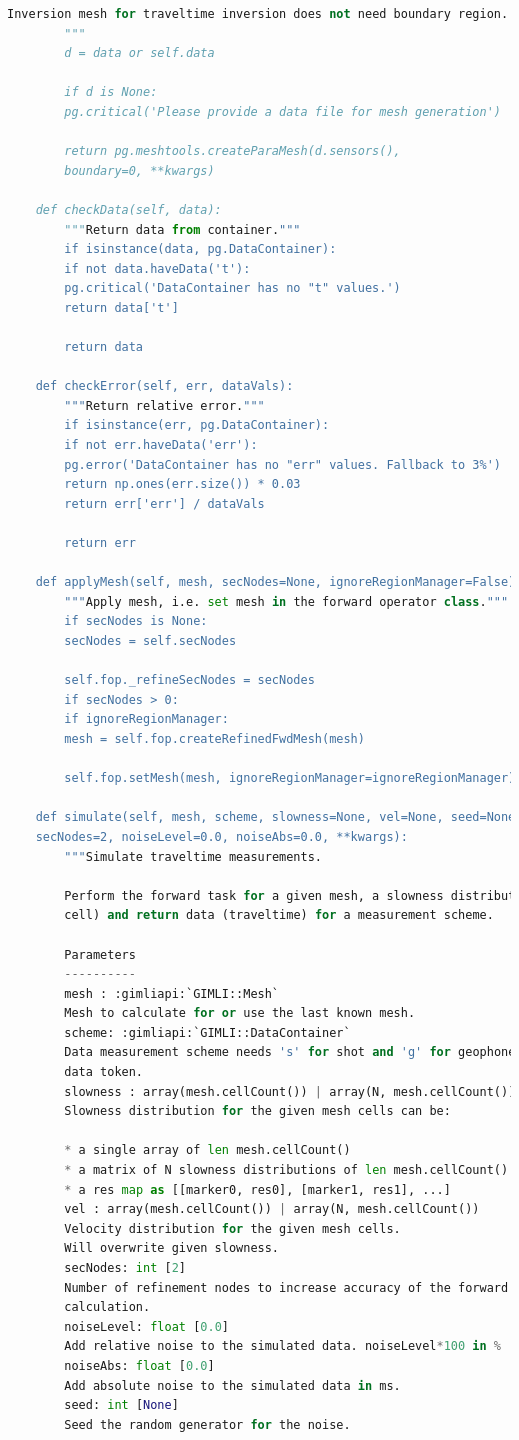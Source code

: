 \documentclass[a4paper, 12 pt]{article} %
\begin{document}
\begin{lstlisting}[language=Python, caption=Código-fonte para pygimli.physics.traveltime.TravelTimeManager]
		Inversion mesh for traveltime inversion does not need boundary region.
		"""
		d = data or self.data
		
		if d is None:
		pg.critical('Please provide a data file for mesh generation')
		
		return pg.meshtools.createParaMesh(d.sensors(),
		boundary=0, **kwargs)
	
	def checkData(self, data):
		"""Return data from container."""
		if isinstance(data, pg.DataContainer):
		if not data.haveData('t'):
		pg.critical('DataContainer has no "t" values.')
		return data['t']
	
		return data
	
	def checkError(self, err, dataVals):
		"""Return relative error."""
		if isinstance(err, pg.DataContainer):
		if not err.haveData('err'):
		pg.error('DataContainer has no "err" values. Fallback to 3%')
		return np.ones(err.size()) * 0.03
		return err['err'] / dataVals
		
		return err
	
	def applyMesh(self, mesh, secNodes=None, ignoreRegionManager=False):
		"""Apply mesh, i.e. set mesh in the forward operator class."""
		if secNodes is None:
		secNodes = self.secNodes
		
		self.fop._refineSecNodes = secNodes
		if secNodes > 0:
		if ignoreRegionManager:
		mesh = self.fop.createRefinedFwdMesh(mesh)
		
		self.fop.setMesh(mesh, ignoreRegionManager=ignoreRegionManager)
	
	def simulate(self, mesh, scheme, slowness=None, vel=None, seed=None,
	secNodes=2, noiseLevel=0.0, noiseAbs=0.0, **kwargs):
		"""Simulate traveltime measurements.
		
		Perform the forward task for a given mesh, a slowness distribution (per
		cell) and return data (traveltime) for a measurement scheme.
		
		Parameters
		----------
		mesh : :gimliapi:`GIMLI::Mesh`
		Mesh to calculate for or use the last known mesh.
		scheme: :gimliapi:`GIMLI::DataContainer`
		Data measurement scheme needs 's' for shot and 'g' for geophone
		data token.
		slowness : array(mesh.cellCount()) | array(N, mesh.cellCount())
		Slowness distribution for the given mesh cells can be:
		
		* a single array of len mesh.cellCount()
		* a matrix of N slowness distributions of len mesh.cellCount()
		* a res map as [[marker0, res0], [marker1, res1], ...]
		vel : array(mesh.cellCount()) | array(N, mesh.cellCount())
		Velocity distribution for the given mesh cells.
		Will overwrite given slowness.
		secNodes: int [2]
		Number of refinement nodes to increase accuracy of the forward
		calculation.
		noiseLevel: float [0.0]
		Add relative noise to the simulated data. noiseLevel*100 in %
		noiseAbs: float [0.0]
		Add absolute noise to the simulated data in ms.
		seed: int [None]
		Seed the random generator for the noise.
		

\end{lstlisting}
\end{document}
